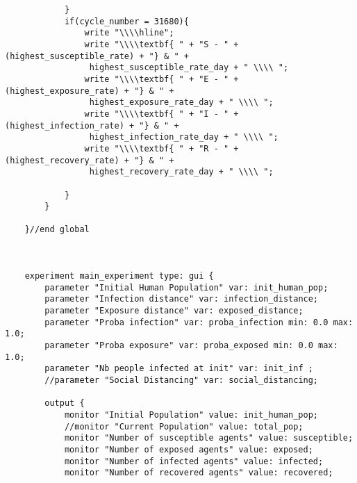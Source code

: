\begin{lstlisting}
            }
            if(cycle_number = 31680){
                write "\\\\hline";
                write "\\\\textbf{ " + "S - " + (highest_susceptible_rate) + "} & " +
                 highest_susceptible_rate_day + " \\\\ ";
                write "\\\\textbf{ " + "E - " + (highest_exposure_rate) + "} & " +
                 highest_exposure_rate_day + " \\\\ ";
                write "\\\\textbf{ " + "I - " + (highest_infection_rate) + "} & " +
                 highest_infection_rate_day + " \\\\ ";
                write "\\\\textbf{ " + "R - " + (highest_recovery_rate) + "} & " +
                 highest_recovery_rate_day + " \\\\ ";
                
            }
        }
    
    }//end global
    
    
    
    experiment main_experiment type: gui {
        parameter "Initial Human Population" var: init_human_pop;
        parameter "Infection distance" var: infection_distance;
        parameter "Exposure distance" var: exposed_distance;
        parameter "Proba infection" var: proba_infection min: 0.0 max: 1.0;
        parameter "Proba exposure" var: proba_exposed min: 0.0 max: 1.0;
        parameter "Nb people infected at init" var: init_inf ;
        //parameter "Social Distancing" var: social_distancing;
        
        output {
            monitor "Initial Population" value: init_human_pop;
            //monitor "Current Population" value: total_pop;
            monitor "Number of susceptible agents" value: susceptible;
            monitor "Number of exposed agents" value: exposed;
            monitor "Number of infected agents" value: infected;
            monitor "Number of recovered agents" value: recovered;
            

\end{lstlisting}
